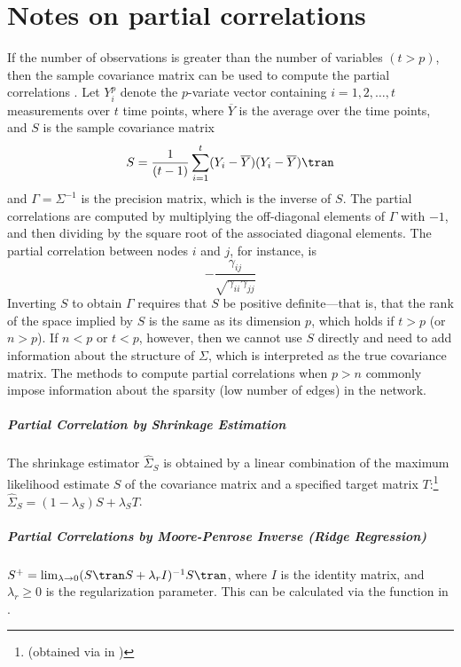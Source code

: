 \chapter{Notes on partial correlations}
\label{app:C}
If the number of observations is greater than the number of variables $(t > p)$, then the sample covariance matrix can be used to compute the partial correlations \cite{lauritzen1996graphical}. Let $Y_i^p$ denote the $p$-variate vector containing $i = 1,2,\ldots,t$ measurements over $t$ time points, where $\overline{Y}$ is the average over the time points, and $S$ is the sample covariance matrix
\begin{equation}
    S = \frac{1}{(t-1)} \sum_{i=1}^t (Y_i - \overline{Y})(Y_i - \overline{Y})\tran
\end{equation}
and $\Gamma = \Sigma^{-1}$ is the precision matrix, which is the inverse of $S$. The partial correlations are computed by multiplying the off-diagonal elements of $\Gamma$ with $-1$, and then dividing by the square root of the associated diagonal elements. The partial correlation between nodes $i$ and $j$, for instance, is
\begin{equation}
    -\frac{\gamma_{ij}}{\sqrt{\gamma_{ii}\gamma_{jj}}}
\end{equation}
Inverting $S$ to obtain $\Gamma$ requires that $S$ be positive definite---that is, that the rank of the space implied by $S$ is the same as its dimension $p$, which holds if $t > p$ (or $n > p$). If $n < p$ or $t < p$, however, then we cannot use $S$ directly and need to add information about the structure of $\Sigma$, which is interpreted as the true covariance matrix. The methods to compute partial correlations when $p > n$ commonly impose information about the sparsity (low number of edges) in the network. 

\paragraph{Partial Correlation by Shrinkage Estimation}
The shrinkage estimator $\hat{\Sigma}_S$ is obtained by a linear combination of the maximum likelihood estimate $S$ of the covariance matrix and a specified target matrix $T$:\footnote{(obtained via  in )} $\hat{\Sigma}_S = (1 - \lambda_{\scriptscriptstyle{S}})S + \lambda_{\scriptscriptstyle{S}} T$.

\paragraph{Partial Correlations by Moore-Penrose Inverse (Ridge Regression)}
$S^+ = \lim_{\lambda\to 0} (S\tran S + \lambda_r I)^{-1} S\tran$, where $I$ is the identity matrix, and $\lambda_r \geq 0$ is the regularization parameter. This can be calculated via the function  in . 

